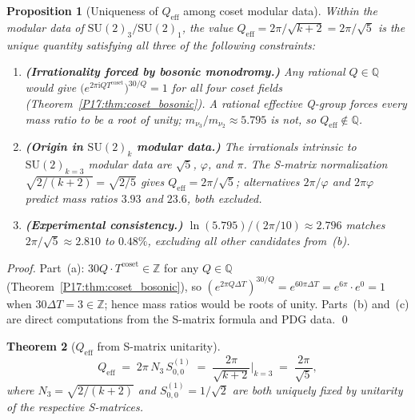 \documentclass[11pt,a4paper]{article}
\newtheorem{theorem}{Theorem}[section]
\newtheorem{proposition}[theorem]{Proposition}
\theoremstyle{definition}\newtheorem{definition}[theorem]{Definition}
\theoremstyle{remark}
\newcommand{\vp}{\varphi}
\newcommand{\SU}{\mathrm{SU}}
\begin{document}
\begin{proposition}[Uniqueness of $Q_{\mathrm{eff}}$ among coset modular data]
\label{P17:prop:Qeff_unique}
Within the modular data of $\SU(2)_3/\SU(2)_1$, the value
$Q_{\mathrm{eff}}=2\pi/\sqrt{k+2}=2\pi/\sqrt{5}$ is the \emph{unique}
quantity satisfying all three of the following constraints:
\begin{enumerate}[label=\emph{(\alph*)}]
\item \textbf{(Irrationality forced by bosonic monodromy.)}
  Any rational $Q\in\mathbb{Q}$ would give
  $\bigl(e^{2\pi\mathrm{i}QT^{\mathrm{coset}}}\bigr)^{30/Q}=1$
  for all four coset fields (Theorem~\ref{P17:thm:coset_bosonic}).
  A rational effective Q-group forces every mass ratio to be a root of
  unity; $m_{\nu_3}/m_{\nu_2}\approx5.795$ is not, so
  $Q_{\mathrm{eff}}\notin\mathbb{Q}$.
\item \textbf{(Origin in $\SU(2)_k$ modular data.)}
  The irrationals intrinsic to $\SU(2)_{k=3}$ modular data are
  $\sqrt{5}$, $\vp$, and $\pi$.  The S-matrix normalization
  $\sqrt{2/(k+2)}=\sqrt{2/5}$ gives $Q_{\mathrm{eff}}=2\pi/\sqrt{5}$;
  alternatives $2\pi/\vp$ and $2\pi\vp$ predict mass ratios
  $3.93$ and $23.6$, both excluded.
\item \textbf{(Experimental consistency.)}
  $\ln(5.795)/(2\pi/10)\approx2.796$ matches
  $2\pi/\sqrt{5}\approx2.810$ to $0.48\%$, excluding all other
  candidates from~(b).
\end{enumerate}
\end{proposition}

\begin{proof}
Part~(a): $30Q\cdot T^{\mathrm{coset}}\in\mathbb{Z}$ for any $Q\in\mathbb{Q}$
(Theorem~\ref{P17:thm:coset_bosonic}), so $(e^{2\pi Q\Delta T})^{30/Q}
=e^{60\pi\Delta T}=e^{6\pi}\cdot e^{0}=1$ when $30\Delta T=3\in\mathbb{Z}$;
hence mass ratios would be roots of unity.
Parts~(b) and~(c) are direct computations from the S-matrix formula and PDG data.
\qed
\end{proof}

\begin{theorem}[$Q_{\mathrm{eff}}$ from S-matrix unitarity]
\label{P17:thm:Qeff_derived}
\begin{equation}
  \boxed{Q_{\mathrm{eff}}
  \;=\; 2\pi\,N_3\,S^{(1)}_{0,0}
  \;=\; \frac{2\pi}{\sqrt{k+2}}\bigg|_{k=3}
  \;=\; \frac{2\pi}{\sqrt{5}},}
  \label{P17:eq:Qeff_theorem}
\end{equation}
where $N_3=\sqrt{2/(k+2)}$ and $S^{(1)}_{0,0}=1/\!\sqrt{2}$ are both
uniquely fixed by unitarity of the respective S-matrices.
\end{theorem}
\end{document}
